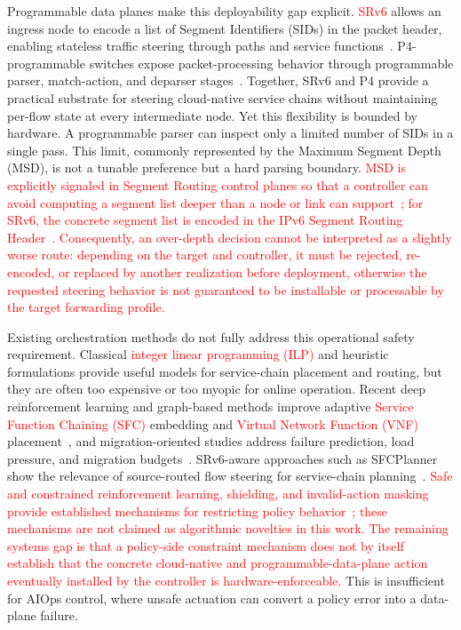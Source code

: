 \documentclass[final,5p]{elsarticle}
\newcommand{\rev}[1]{\textcolor{red}{#1}}
\begin{document}
Programmable data planes make this deployability gap explicit. \rev{SRv6} allows an ingress node to encode a list of Segment Identifiers (SIDs) in the packet header, enabling stateless traffic steering through paths and service functions~\cite{filsfils2015segment,rfc8986,rfc9352}. P4-programmable switches expose packet-processing behavior through programmable parser, match-action, and deparser stages~\cite{jeyakumar2014p4}. Together, SRv6 and P4 provide a practical substrate for steering cloud-native service chains without maintaining per-flow state at every intermediate node. Yet this flexibility is bounded by hardware. A programmable parser can inspect only a limited number of SIDs in a single pass. This limit, commonly represented by the Maximum Segment Depth (MSD), is not a tunable preference but a hard parsing boundary. \rev{MSD is explicitly signaled in Segment Routing control planes so that a controller can avoid computing a segment list deeper than a node or link can support~\cite{rfc8491}; for SRv6, the concrete segment list is encoded in the IPv6 Segment Routing Header~\cite{rfc8754}. Consequently, an over-depth decision cannot be interpreted as a slightly worse route: depending on the target and controller, it must be rejected, re-encoded, or replaced by another realization before deployment, otherwise the requested steering behavior is not guaranteed to be installable or processable by the target forwarding profile.}

Existing orchestration methods do not fully address this operational safety requirement. Classical \rev{integer linear programming (ILP)} and heuristic formulations provide useful models for service-chain placement and routing, but they are often too expensive or too myopic for online operation. Recent deep reinforcement learning and graph-based methods improve adaptive \rev{Service Function Chaining (SFC)} embedding and \rev{Virtual Network Function (VNF)} placement~\cite{wang2021drl,xiao2023twostage,liu2024sfcml,taktak2024drl,wu2025drl}, and migration-oriented studies address failure prediction, load pressure, and migration budgets~\cite{zhai2023migration,addad2022ai,qin2023sfcmigrationbudget,afrasiabi2024cluster,zhang2025sfcmigration,hu2026rlpmo}. SRv6-aware approaches such as SFCPlanner show the relevance of source-routed flow steering for service-chain planning~\cite{qiu2024sfcplanner}. \rev{Safe and constrained reinforcement learning, shielding, and invalid-action masking provide established mechanisms for restricting policy behavior~\cite{alshiekh2018shielding,gu2024safe,wachi2024constraint,huang2022closer}; these mechanisms are not claimed as algorithmic novelties in this work. The remaining systems gap is that a policy-side constraint mechanism does not by itself establish that the concrete cloud-native and programmable-data-plane action eventually installed by the controller is hardware-enforceable.} This is insufficient for AIOps control, where unsafe actuation can convert a policy error into a data-plane failure.
\end{document}
